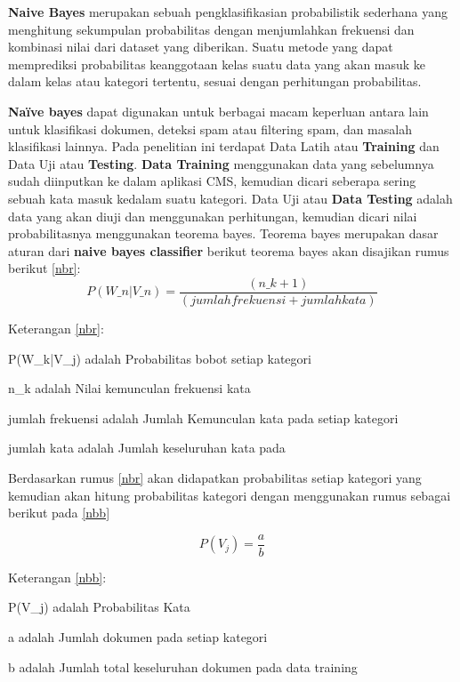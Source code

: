\par \textbf{Naive Bayes} merupakan sebuah pengklasifikasian probabilistik sederhana yang menghitung sekumpulan probabilitas dengan menjumlahkan frekuensi dan kombinasi nilai dari dataset yang diberikan. Suatu metode yang dapat memprediksi probabilitas keanggotaan kelas suatu data yang akan masuk ke dalam kelas atau kategori tertentu, sesuai dengan perhitungan probabilitas.
\par \textbf{Naïve bayes} dapat digunakan untuk berbagai macam keperluan antara lain untuk klasifikasi dokumen, deteksi spam atau filtering spam, dan masalah klasifikasi lainnya. Pada penelitian ini terdapat Data Latih atau \textbf{Training} dan Data Uji atau \textbf{Testing}.\textbf{ Data Training} menggunakan data yang sebelumnya sudah diinputkan ke dalam aplikasi CMS, kemudian dicari seberapa sering sebuah kata masuk kedalam suatu kategori. Data Uji atau \textbf{Data Testing} adalah data yang akan diuji dan menggunakan perhitungan, kemudian dicari nilai probabilitasnya menggunakan teorema bayes. Teorema bayes merupakan dasar aturan dari \textbf{naive bayes classifier} berikut teorema bayes akan disajikan rumus berikut \ref{nbr}:
\begin{equation}
\label{nbr}
    P(W\_n|V\_n) = \frac{(n\_k + 1)}{(jumlah frekuensi + jumlah kata)} 
\end{equation} 
\par Keterangan \ref{nbr}:
\par P(W\_k|V\_j) adalah Probabilitas bobot setiap kategori
\par n\_k adalah Nilai kemunculan frekuensi kata
\par jumlah frekuensi adalah Jumlah Kemunculan kata pada setiap kategori
\par jumlah kata adalah Jumlah keseluruhan kata pada 

\par Berdasarkan rumus \ref{nbr} akan didapatkan probabilitas setiap kategori yang kemudian akan hitung probabilitas kategori dengan menggunakan rumus sebagai berikut pada \ref{nbb}

\begin{equation}
\label{nbb}
    P(V_j) = \frac{a}{b} 
\end{equation} 

\par Keterangan \ref{nbb}:
\par P(V\_j) adalah Probabilitas Kata
\par a adalah Jumlah dokumen pada setiap kategori
\par b adalah Jumlah total keseluruhan dokumen pada data training


